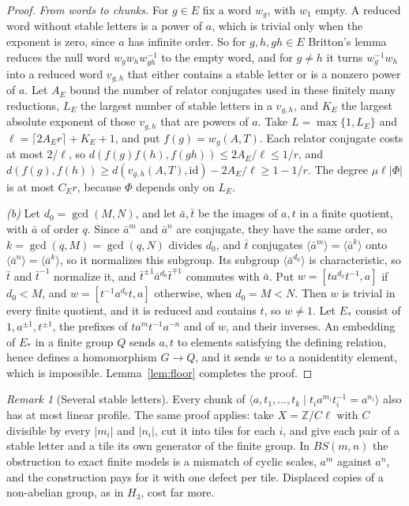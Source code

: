 \documentclass[11pt,a4paper]{article}
\theoremstyle{plain}
\theoremstyle{definition}
\theoremstyle{remark}
\newtheorem{remark}[theorem]{Remark}
\begin{document}
\begin{proof}
\emph{From words to chunks.} For $g\in E$ fix a word $w_g$, with $w_1$ empty. A reduced word without stable letters is a power of $a$, which is trivial only
when the exponent is zero, since $a$ has infinite order. So for $g,h,gh\in E$ Britton's lemma reduces the null word $w_gw_hw_{gh}^{-1}$ to the
empty word, and for $g\ne h$ it turns $w_g^{-1}w_h$ into a reduced word $v_{g,h}$ that either contains a stable letter or is a nonzero power
of $a$. Let $A_E$ bound the number of relator conjugates used in these finitely many reductions, $L_E$ the largest number of stable letters in
a $v_{g,h}$, and $K_E$ the largest absolute exponent of those $v_{g,h}$ that are powers of $a$. Take $L=\max\{1,L_E\}$ and $\ell=\lceil2A_Er\rceil+K_E+1$, and put $f(g)=w_g(A,T)$. Each relator conjugate costs
at most $2/\ell$, so $d(f(g)f(h),f(gh))\le2A_E/\ell\le1/r$, and $d(f(g),f(h))\ge d(v_{g,h}(A,T),\mathrm{id})-2A_E/\ell\ge1-1/r$. The degree
$\mu\ell|\Phi|$ is at most $C_Er$, because $\Phi$ depends only on $L_E$.

\emph{(b)} Let $d_0=\gcd(M,N)$, and let $\bar a,\bar t$ be the images of $a,t$ in a finite quotient, with $\bar a$ of order $q$. Since $\bar a^m$
and $\bar a^n$ are conjugate, they have the same order, so $k=\gcd(q,M)=\gcd(q,N)$ divides $d_0$, and $\bar t$ conjugates
$\langle\bar a^m\rangle=\langle\bar a^k\rangle$ onto $\langle\bar a^n\rangle=\langle\bar a^k\rangle$, so it normalizes this subgroup. Its subgroup $\langle\bar a^{d_0}\rangle$ is characteristic, so $\bar t$ and $\bar t^{-1}$
normalize it, and $\bar t^{\pm1}\bar a^{d_0}\bar t^{\mp1}$ commutes with $\bar a$. Put $w=[ta^{d_0}t^{-1},a]$ if $d_0<M$, and
$w=[t^{-1}a^{d_0}t,a]$ otherwise, when $d_0=M<N$. Then $w$ is trivial in every finite quotient, and it is reduced and contains $t$, so $w\ne1$.
Let $E_*$ consist of $1,a^{\pm1},t^{\pm1}$, the prefixes of $ta^mt^{-1}a^{-n}$ and of $w$, and their inverses. An embedding of $E_*$ in a finite
group $Q$ sends $a,t$ to elements satisfying the defining relation, hence defines a homomorphism $G\to Q$, and it sends $w$ to a nonidentity
element, which is impossible. Lemma~\ref{lem:floor} completes the proof.
\end{proof}

\begin{remark}[Several stable letters]
Every chunk of $\langle a,t_1,\dots,t_k\mid t_ia^{m_i}t_i^{-1}=a^{n_i}\rangle$ also has at most linear profile. The same proof applies: take
$X=\mathbb Z/C\ell$ with $C$ divisible by every $|m_i|$ and $|n_i|$, cut it into tiles for each $i$, and give each pair of a stable letter and a
tile its own generator of the finite group. In $BS(m,n)$ the obstruction to exact finite models is a mismatch of cyclic scales, $a^m$ against
$a^n$, and the construction pays for it with one defect per tile. Displaced copies of a non-abelian group, as in $H_3$, cost far more.
\end{remark}
\end{document}
